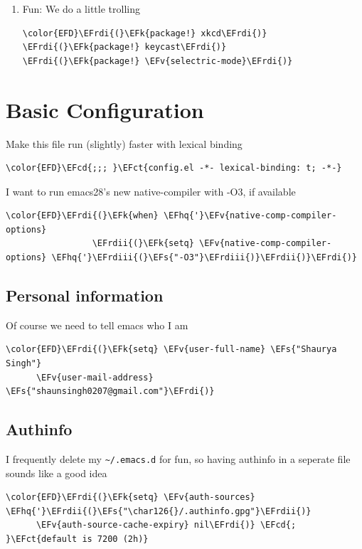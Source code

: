 \documentclass{scrartcl}
\newcommand{\EFk}[1]{\textcolor{EFk}{#1}} %
\newcommand{\EFs}[1]{\textcolor{EFs}{#1}} %
\newcommand{\EFct}[1]{\textcolor{EFct}{#1}} %
\newcommand{\EFv}[1]{\textcolor{EFv}{#1}} %
\newcommand{\EFcd}[1]{\textcolor{EFcd}{#1}} %
\newcommand{\EFhq}[1]{\textcolor{EFhq}{#1}} %
\newcommand{\EFrdi}[1]{\textcolor{EFrdi}{#1}} %
\newcommand{\EFrdii}[1]{\textcolor{EFrdii}{#1}} %
\newcommand{\EFrdiii}[1]{\textcolor{EFrdiii}{#1}} %
\begin{document}
\begin{enumerate}
\item Fun:
\label{sec:org714da53}
We do a little trolling
\begin{Code}
\begin{Verbatim}[]
\color{EFD}\EFrdi{(}\EFk{package!} xkcd\EFrdi{)}
\EFrdi{(}\EFk{package!} keycast\EFrdi{)}
\EFrdi{(}\EFk{package!} \EFv{selectric-mode}\EFrdi{)}
\end{Verbatim}
\end{Code}
\end{enumerate}

\section{Basic Configuration}
\label{sec:org55df5aa}
Make this file run (slightly) faster with lexical binding
\begin{Code}
\begin{Verbatim}[]
\color{EFD}\EFcd{;;; }\EFct{config.el -*- lexical-binding: t; -*-}
\end{Verbatim}
\end{Code}

I want to run emacs28's new native-compiler with -O3, if available
\begin{Code}
\begin{Verbatim}[]
\color{EFD}\EFrdi{(}\EFk{when} \EFhq{'}\EFv{native-comp-compiler-options}
                 \EFrdii{(}\EFk{setq} \EFv{native-comp-compiler-options} \EFhq{'}\EFrdiii{(}\EFs{"-O3"}\EFrdiii{)}\EFrdii{)}\EFrdi{)}
\end{Verbatim}
\end{Code}

\subsection{Personal information}
\label{sec:org2378ac1}
Of course we need to tell emacs who I am
\begin{Code}
\begin{Verbatim}[]
\color{EFD}\EFrdi{(}\EFk{setq} \EFv{user-full-name} \EFs{"Shaurya Singh"}
      \EFv{user-mail-address} \EFs{"shaunsingh0207@gmail.com"}\EFrdi{)}
\end{Verbatim}
\end{Code}

\subsection{Authinfo}
\label{sec:org7f1ce9a}
I frequently delete my \texttt{\textasciitilde{}/.emacs.d} for fun, so having authinfo in a seperate file
sounds like a good idea
\begin{Code}
\begin{Verbatim}[]
\color{EFD}\EFrdi{(}\EFk{setq} \EFv{auth-sources} \EFhq{'}\EFrdii{(}\EFs{"\char126{}/.authinfo.gpg"}\EFrdii{)}
      \EFv{auth-source-cache-expiry} nil\EFrdi{)} \EFcd{; }\EFct{default is 7200 (2h)}
\end{Verbatim}
\end{Code}
\end{document}
